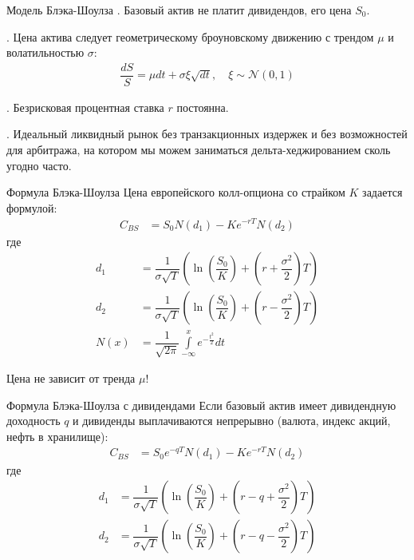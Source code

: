 \documentclass{beamer}
\begin{document}
\begin{frame}{Модель Блэка-Шоулза}
. Базовый актив не платит дивидендов, его цена $S_0$.

. Цена актива следует геометрическому броуновскому движению с трендом $\mu$ и волатильностью $\sigma$:
\begin{align*}
\dfrac{dS}{S} = \mu dt + \sigma\xi\sqrt{dt}, \quad \xi \sim \mathcal{N}(0,1)
\end{align*}

. Безрисковая процентная ставка $r$ постоянна.

. Идеальный ликвидный рынок без транзакционных издержек и без возможностей для арбитража, на котором мы можем заниматься дельта-хеджированием сколь угодно часто.
\end{frame}



\begin{frame}{Формула Блэка-Шоулза}
Цена европейского колл-опциона со страйком $K$ задается формулой:
\begin{align*}
C_{BS} &= S_0N(d_1) - Ke^{-rT}N(d_2)
\end{align*}
где
\begin{align*}
d_1 &= \dfrac{1}{\sigma\sqrt{T}}\left( \ln\left(\dfrac{S_0}{K}\right) + \left(r + \dfrac{\sigma^2}{2}\right)T\right) \\
d_2 &= \dfrac{1}{\sigma\sqrt{T}}\left( \ln\left(\dfrac{S_0}{K}\right) + \left(r - \dfrac{\sigma^2}{2}\right)T\right) \\
N(x) &= \dfrac{1}{\sqrt{2\pi}}\int\limits_{-\infty}^x e^{-\frac{t^2}{2}}dt
\end{align*}

\justify
Цена не зависит от тренда $\mu$!
\end{frame}



\begin{frame}{Формула Блэка-Шоулза с дивидендами}
\justify
Если базовый актив имеет дивидендную доходность $q$  и дивиденды выплачиваются непрерывно (валюта, индекс акций, нефть в хранилище):
\begin{align*}
C_{BS} &= S_0e^{-qT}N(d_1) - Ke^{-rT}N(d_2)
\end{align*}
где
\begin{align*}
d_1 &= \dfrac{1}{\sigma\sqrt{T}}\left( \ln\left(\dfrac{S_0}{K}\right) + \left(r -q + \dfrac{\sigma^2}{2}\right)T\right) \\
d_2 &= \dfrac{1}{\sigma\sqrt{T}}\left( \ln\left(\dfrac{S_0}{K}\right) + \left(r -q- \dfrac{\sigma^2}{2}\right)T\right)
\end{align*}
\end{frame}
\end{document}

